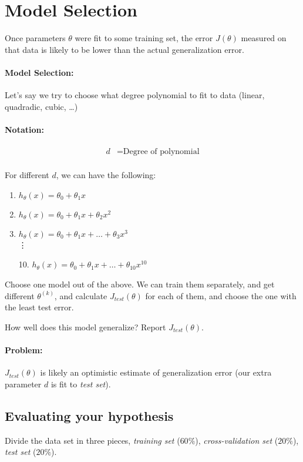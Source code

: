 \section{Model Selection}
Once parameters $\theta$ were fit to some training set, the error $J(\theta)$ measured
on that data is likely to be lower than the actual generalization error.

\paragraph{Model Selection:} Let's say we try to choose what degree polynomial
to fit to data (linear, quadradic, cubic, \dots)

\paragraph{Notation:}
\begin{align*}
	d & = \text{Degree of polynomial} \\
\end{align*}

For different $d$, we can have the following:
\begin{enumerate}
	\item $h_\theta(x) = \theta_0 + \theta_1x$
	\item $h_\theta(x) = \theta_0 + \theta_1x + \theta_2x^2$
	\item $h_\theta(x) = \theta_0 + \theta_1x + \dots + \theta_3x^3$\\
	      \vdots
	\item[10.] $h_\theta(x) = \theta_0 + \theta_1x + \dots + \theta_{10}x^{10}$
\end{enumerate}

Choose one model out of the above. We can train them separately, and get different
$\theta^{(k)}$, and calculate $J_{test}(\theta)$ for each of them, and choose
the one with the least test error.

How well does this model generalize? Report $J_{test}(\theta)$.

\paragraph{Problem:} $J_{test}(\theta)$ is likely an optimistic estimate of
generalization error (our extra parameter $d$ is fit to \emph{test set}).

\subsection{Evaluating your hypothesis}
Divide the data set in three pieces, \emph{training set} ($60\%$), \emph{cross-validation
	set} ($20\%$), \emph{test set} ($20\%$).

